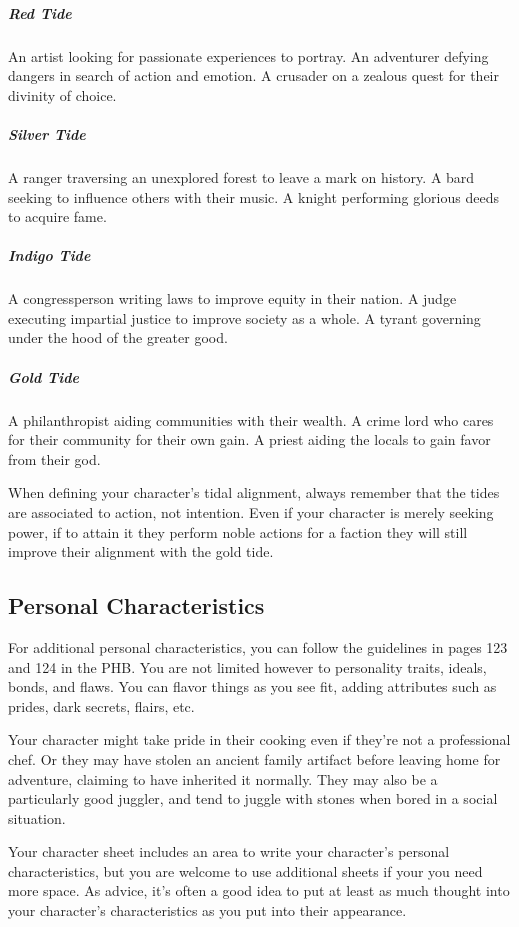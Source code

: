     \subparagraph{Red Tide} An artist looking for passionate experiences to portray.
        An adventurer defying dangers in search of action and emotion.
        A crusader on a zealous quest for their divinity of choice.

    \subparagraph{Silver Tide} A ranger traversing an unexplored forest to leave a mark on history.
        A bard seeking to influence others with their music.
        A knight performing glorious deeds to acquire fame.

    \subparagraph{Indigo Tide} A congressperson writing laws to improve equity in their nation.
        A judge executing impartial justice to improve society as a whole.
        A tyrant governing under the hood of the greater good.

    \subparagraph{Gold Tide} A philanthropist aiding communities with their wealth.
        A crime lord who cares for their community for their own gain.
        A priest aiding the locals to gain favor from their god.

    When defining your character's tidal alignment, always remember that the tides are associated to action, not intention.
    Even if your character is merely seeking power, if to attain it they perform noble actions for a faction they will still improve their alignment with the gold tide.



\subsection*{Personal Characteristics}
    For additional personal characteristics, you can follow the guidelines in pages 123 and 124 in the PHB.
    You are not limited however to personality traits, ideals, bonds, and flaws.
    You can flavor things as you see fit, adding attributes such as prides, dark secrets, flairs, etc.

    Your character might take pride in their cooking even if they're not a professional chef.
    Or they may have stolen an ancient family artifact before leaving home for adventure, claiming to have inherited it normally.
    They may also be a particularly good juggler, and tend to juggle with stones when bored in a social situation.

    Your character sheet includes an area to write your character's personal characteristics, but you are welcome to use additional sheets if your you need more space.
    As advice, it's often a good idea to put at least as much thought into your character's characteristics as you put into their appearance.
